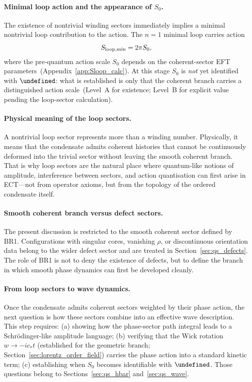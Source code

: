 \documentclass[11pt,a4paper]{article}
\let\hbar\undefined
\numberwithin{equation}{section}
\begin{document}
\paragraph{Minimal loop action and the appearance of $S_0$.}
The existence of nontrivial winding sectors immediately implies a
minimal nontrivial loop contribution to the action.
The $n=1$ minimal loop carries action
\begin{equation}
  \label{eq:qs_loop_min}
  S_{\rm loop,min} = 2\pi S_0,
\end{equation}
where the pre-quantum action scale $S_0$ depends on the coherent-sector
EFT parameters~(Appendix~\ref{app:Sloop_calc}).
At this stage $S_0$ is \emph{not} yet identified with $\hbar$: what
is established is only that the coherent branch carries a distinguished
action scale~(Level~A for existence; Level~B for explicit value pending
the loop-sector calculation).

\paragraph{Physical meaning of the loop sectors.}
A nontrivial loop sector represents more than a winding number.
Physically, it means that the condensate admits coherent histories that
cannot be continuously deformed into the trivial sector without leaving
the smooth coherent branch.
That is why loop sectors are the natural place where quantum-like
notions of amplitude, interference between sectors, and action
quantisation can first arise in ECT---not from operator axioms, but
from the topology of the ordered condensate itself.

\paragraph{Smooth coherent branch versus defect sectors.}
The present discussion is restricted to the smooth coherent sector defined by BR1.
Configurations with singular cores, vanishing $\rho$, or
discontinuous orientation data belong to the wider defect sector
and are treated in Section~\ref{sec:qs_defects}.
The role of BR1 is not to deny the existence of defects, but to define
the branch in which smooth phase dynamics can first be developed
cleanly.

\paragraph{From loop sectors to wave dynamics.}
Once the condensate admits coherent sectors weighted by their phase
action, the next question is how these sectors combine into an
effective wave description.
This step requires: (a) showing how the phase-sector path integral
leads to a Schr\"odinger-like amplitude language; (b) verifying that
the Wick rotation $w\to -ic_*t$ (established for the geometric branch;
Section~\ref{sec:lorentz_order_field}) carries the phase action into a
standard kinetic term; (c) establishing when $S_0$ becomes
identifiable with $\hbar$.
Those questions belong to Sections~\ref{sec:qs_hbar}
and~\ref{sec:qs_wave}.
\end{document}
